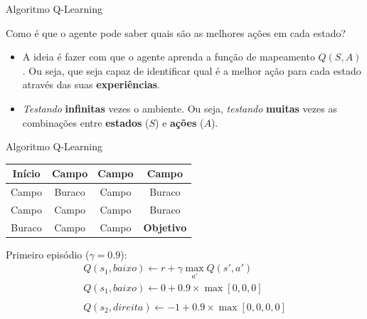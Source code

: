 \documentclass{beamer}
\begin{document}
\begin{frame}{Algoritmo Q-Learning}

	\begin{block}{}
		Como é que o agente pode saber quais são as melhores ações em cada estado?
	\end{block}

\pause

	\begin{itemize}
		\item A ideia é fazer com que o agente aprenda a função de mapeamento $Q(S,A)$. 
		Ou seja, que seja capaz de identificar qual é a melhor ação para cada estado 
		através das suas \textbf{experiências}. 
		\item \textit{Testando} \textbf{infinitas} vezes o ambiente. 
		Ou seja, \textit{testando} \textbf{muitas} vezes as combinações entre 
		\textbf{estados} ($S$) e \textbf{ações} ($A$). 
	\end{itemize}

\end{frame}

\begin{frame}{Algoritmo Q-Learning}
\begin{small}
\begin{center}
	\begin{tabular}{ |c|c|c|c| } 
		\hline
		\cellcolor{red!25} Início & Campo & Campo & Campo \\ 
		\hline
		Campo & \cellcolor{black!25} Buraco & Campo &  \cellcolor{black!25} Buraco\\ 
		\hline
		 Campo & Campo & Campo & \cellcolor{black!25} Buraco\\ 
		\hline
		\cellcolor{black!25} Buraco & Campo & Campo & \textbf{Objetivo} \\ 
		\hline
	\end{tabular}
\end{center}
\end{small}

Primeiro episódio ($\gamma = 0.9$):
\begin{eqnarray}
Q(s_{1}, baixo) \leftarrow  r + \gamma \max_{a'}{Q(s', a')} \nonumber \\
Q(s_{1}, baixo) \leftarrow  0 + 0.9 \times \max[0, 0, 0] \nonumber \\ \nonumber \\
Q(s_{2}, direita) \leftarrow  -1 + 0.9 \times \max[0, 0, 0,0] \nonumber 
\end{eqnarray}

\end{frame}
\end{document}
